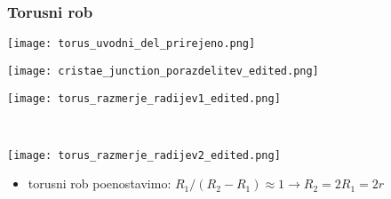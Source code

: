 \documentclass[slovene]{beamer}
\begin{document}
   	
   	\begin{frame}
   		\frametitle{Torusni rob}
   		\begin{minipage}{1\textwidth}
   			\begin{minipage}{0.33\textwidth}
   			\texttt{[image: torus\_uvodni\_del\_prirejeno.png]}
   			\end{minipage}%
   			\begin{minipage}{0.33\textwidth}
   				\texttt{[image: cristae\_junction\_porazdelitev\_edited.png]}
  			\end{minipage}%
   			\begin{minipage}{0.33\textwidth}
   				\texttt{[image: torus\_razmerje\_radijev1\_edited.png]}
   			\end{minipage}
   		\end{minipage}
   		\\
   		
   		\begin{minipage}{1\textwidth}
   			\begin{minipage}{0.33\textwidth}
   				\texttt{[image: torus\_razmerje\_radijev2\_edited.png]}
   			\end{minipage}%
   			\begin{minipage}{0.67\textwidth}
   				\begin{itemize}
   					\item torusni rob poenostavimo:
   					$R_1/(R_2-R_1)\approx1\rightarrow R_2=2R_1=2r$
   				\end{itemize}
   			\end{minipage}
   		\end{minipage}
   	\end{frame}
   	
   	
\end{document}
